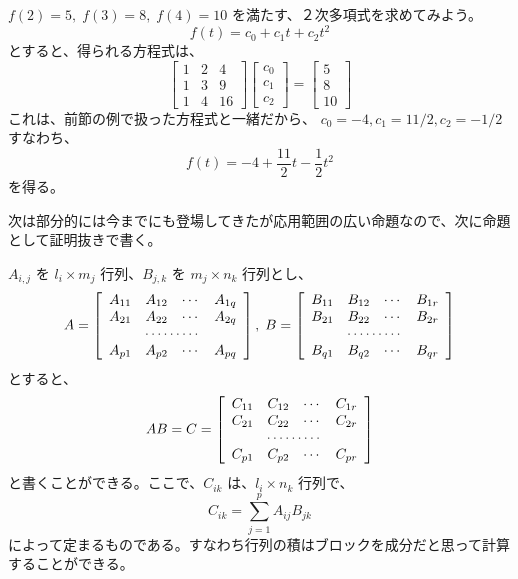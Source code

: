 \begin{eg}
$f(2) = 5, \;f(3) = 8,\;f(4) = 10$ を満たす、２次多項式を求めてみよう。
$$f(t) = c_0 + c_1t + c_2t^2$$
とすると、得られる方程式は、
$$\left[\begin{array}{ccc}1 & 2 & 4\\ 1 & 3 & 9\\ 1 & 4 & 16 \end{array}\right]
\left[\begin{array}{c}c_0 \\c_1 \\ c_2\end{array}\right] = 
\left[\begin{array}{c}5 \\8 \\ 10\end{array}\right]$$
これは、前節の例で扱った方程式と一緒だから、
$c_0 = -4, c_1 = 11/2, c_2 = -1/2$ すなわち、
$$f(t) = -4 + \frac{11}{2}t - \frac12t^2$$
を得る。
\end{eg}

次は部分的には今までにも登場してきたが応用範囲の広い命題なので、次に命題として証明抜きで書く。

\begin{prop}
$A_{i,j}$ を $l_i\times m_j$ 行列、$B_{j,k}$ を $m_j\times n_k$ 行列とし、
$$A = \left[\begin{array}{cccc}A_{11} & A_{12} & \cdots & A_{1q}\\
A_{21} & A_{22} & \cdots & A_{2q}\\
\multicolumn{4}{c}{\cdots\cdots\cdots}\\
A_{p1} & A_{p2} & \cdots & A_{pq}\end{array}\right],\;
B = \left[\begin{array}{cccc}B_{11} & B_{12} & \cdots & B_{1r}\\
B_{21} & B_{22} & \cdots & B_{2r}\\
\multicolumn{4}{c}{\cdots\cdots\cdots}\\
B_{q1} & B_{q2} & \cdots & B_{qr}\end{array}\right]$$
とすると、
$$AB = C = \left[\begin{array}{cccc}C_{11} & C_{12} & \cdots & C_{1r}\\
C_{21} & C_{22} & \cdots & C_{2r}\\
\multicolumn{4}{c}{\cdots\cdots\cdots}\\
C_{p1} & C_{p2} & \cdots & C_{pr}\end{array}\right]$$
と書くことができる。ここで、$C_{ik}$ は、$l_i\times n_k$ 行列で、
$$C_{ik} = \sum_{j = 1}^p A_{ij}B_{jk}$$
によって定まるものである。すなわち行列の積はブロックを成分だと思って計算することができる。
\end{prop}

